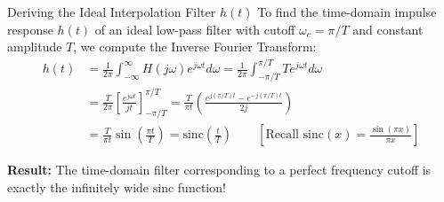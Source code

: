 \begin{frame}{Deriving the Ideal Interpolation Filter $h(t)$}
  To find the time-domain impulse response $h(t)$ of an ideal low-pass filter with cutoff $\omega_c = \pi/T$ and constant amplitude $T$, we compute the Inverse Fourier Transform:
  \vspace{-0.2cm}
  \begin{align*}
    h(t) & = \frac{1}{2\pi} \int_{-\infty}^{\infty} H(j\omega) e^{j\omega t} d\omega = \frac{1}{2\pi} \int_{-\pi/T}^{\pi/T} T e^{j\omega t} d\omega                                \\
    & = \frac{T}{2\pi} \left[ \frac{e^{j\omega t}}{jt} \right]_{-\pi/T}^{\pi/T} = \frac{T}{\pi t} \left( \frac{e^{j(\pi/T)t} - e^{-j(\pi/T)t}}{2j} \right)                    \\
    & = \frac{T}{\pi t} \sin\left(\frac{\pi t}{T}\right) = \text{sinc}\left(\frac{t}{T}\right) \qquad \left[\text{Recall } \text{sinc}(x) = \frac{\sin(\pi x)}{\pi x} \right]
  \end{align*}
  \medskip

  \textbf{Result:} The time-domain filter corresponding to a perfect frequency cutoff is exactly the infinitely wide $\text{sinc}$ function!
\end{frame}


